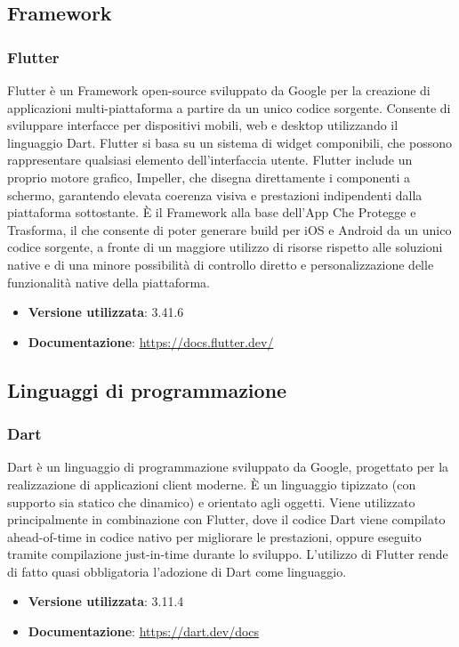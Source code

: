 \documentclass[a4paper,12pt]{article}
\newcommand{\ignoreglossary}{}
\begin{document}
\subsection{Framework} \label{subsec:framework}

\subsubsection{Flutter}
Flutter è un Framework open-source sviluppato da Google per la creazione di applicazioni multi-piattaforma a partire da un unico codice sorgente. Consente di sviluppare interfacce per dispositivi mobili, web e desktop utilizzando il linguaggio Dart. Flutter si basa su un sistema di widget componibili, che possono rappresentare qualsiasi elemento dell'interfaccia \ignoreglossary{utente}. Flutter include un proprio motore grafico, Impeller, che disegna direttamente i componenti a schermo, garantendo elevata coerenza visiva e prestazioni indipendenti dalla piattaforma sottostante. È il Framework alla base dell'App Che Protegge e Trasforma, il che consente di poter generare build per iOS e Android da un unico codice sorgente, a fronte di un maggiore utilizzo di risorse rispetto alle soluzioni native e di una minore possibilità di controllo diretto e personalizzazione delle funzionalità native della piattaforma.
\begin{itemize}
    \item \textbf{Versione utilizzata}: 3.41.6
    \item \textbf{Documentazione}: \url{https://docs.flutter.dev/}
\end{itemize}

\subsection{Linguaggi di programmazione} \label{subsec:linguaggi}

\subsubsection{Dart}
Dart è un linguaggio di programmazione sviluppato da Google, progettato per la realizzazione di applicazioni client moderne. È un linguaggio tipizzato (con supporto sia statico che dinamico) e orientato agli oggetti. Viene utilizzato principalmente in combinazione con Flutter, dove il codice Dart viene compilato ahead-of-time in codice nativo per migliorare le prestazioni, oppure eseguito tramite compilazione just-in-time durante lo sviluppo. L'utilizzo di Flutter rende di fatto quasi obbligatoria l'adozione di Dart come linguaggio.
\begin{itemize}
    \item \textbf{Versione utilizzata}: 3.11.4
    \item \textbf{Documentazione}: \url{https://dart.dev/docs}
\end{itemize}
\end{document}
